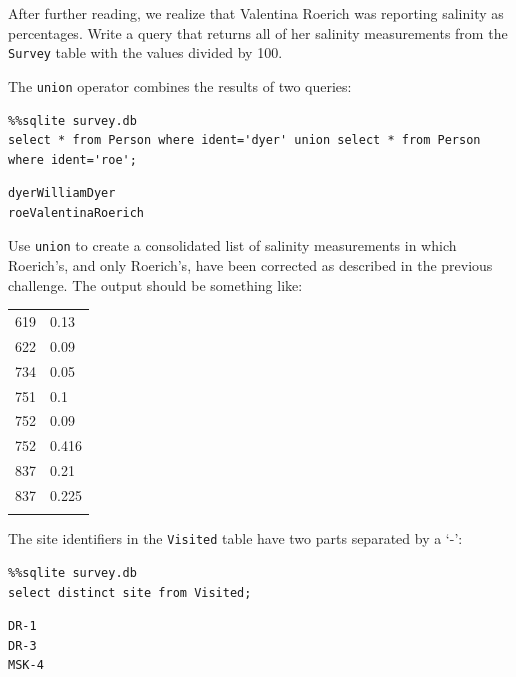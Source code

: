 \documentclass{book}
\begin{document}
\begin{swcenumerate}
\item
  After further reading, we realize that Valentina Roerich was reporting
  salinity as percentages. Write a query that returns all of her
  salinity measurements from the \texttt{Survey} table with the values
  divided by 100.
\item
  The \texttt{union} operator combines the results of two queries:
\end{swcenumerate}

\begin{verbatim}
%%sqlite survey.db
select * from Person where ident='dyer' union select * from Person where ident='roe';
\end{verbatim}

\begin{verbatim}
dyerWilliamDyer
roeValentinaRoerich
\end{verbatim}

Use \texttt{union} to create a consolidated list of salinity
measurements in which Roerich's, and only Roerich's, have been corrected
as described in the previous challenge. The output should be something
like:

\begin{tabular}{@{}ll@{}}
\hline\noalign{\medskip}
619 & 0.13
\\\noalign{\medskip}
622 & 0.09
\\\noalign{\medskip}
734 & 0.05
\\\noalign{\medskip}
751 & 0.1
\\\noalign{\medskip}
752 & 0.09
\\\noalign{\medskip}
752 & 0.416
\\\noalign{\medskip}
837 & 0.21
\\\noalign{\medskip}
837 & 0.225
\\\noalign{\medskip}
\hline
\end{tabular}

\begin{swcenumerate}
\setcounter{enumi}{2}
\item
  The site identifiers in the \texttt{Visited} table have two parts
  separated by a `-':
\end{swcenumerate}

\begin{verbatim}
%%sqlite survey.db
select distinct site from Visited;
\end{verbatim}

\begin{verbatim}
DR-1
DR-3
MSK-4
\end{verbatim}
\end{document}
